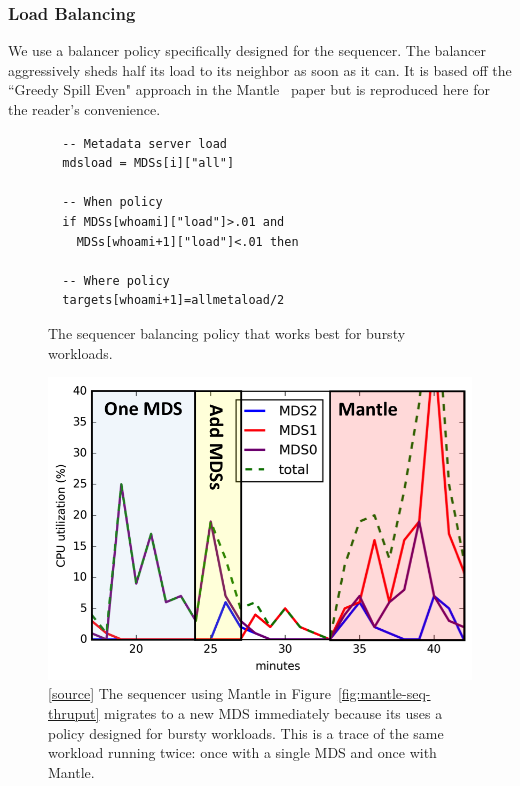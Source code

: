 \documentclass[10pt,twocolumn]{article}
\begin{document}
\subsubsection{Load Balancing}

We use a balancer policy specifically designed for the sequencer. The balancer
aggressively sheds half its load to its neighbor as soon as it can.  It is
based off the ``Greedy Spill Even" approach in the
Mantle~\cite{sevilla:sc15-mantle} paper but is reproduced here for the reader's
convenience. 

\begin{figure}[]
\begin{lstlisting}
  -- Metadata server load
  mdsload = MDSs[i]["all"]
  
  -- When policy
  if MDSs[whoami]["load"]>.01 and 
    MDSs[whoami+1]["load"]<.01 then
    
  -- Where policy
  targets[whoami+1]=allmetaload/2
\end{lstlisting}
\caption{The sequencer balancing policy that works best for bursty workloads.
\label{listing:greedy-spill}}
\end{figure}

\begin{figure}[t!]
\centering
\includegraphics{figures/mantle-cpu-utilization-annotate.png}
\caption{[\href{https://github.com/double-blind-submitter/osdi16}{source}] The
sequencer using Mantle in Figure~\ref{fig:mantle-seq-thruput} migrates to a new
MDS immediately because its uses a policy designed for bursty workloads. This
is a trace of the same workload running twice: once with a single MDS and once
with Mantle.}
\label{fig:mantle-cpu-utilization}
\end{figure}
\end{document}
